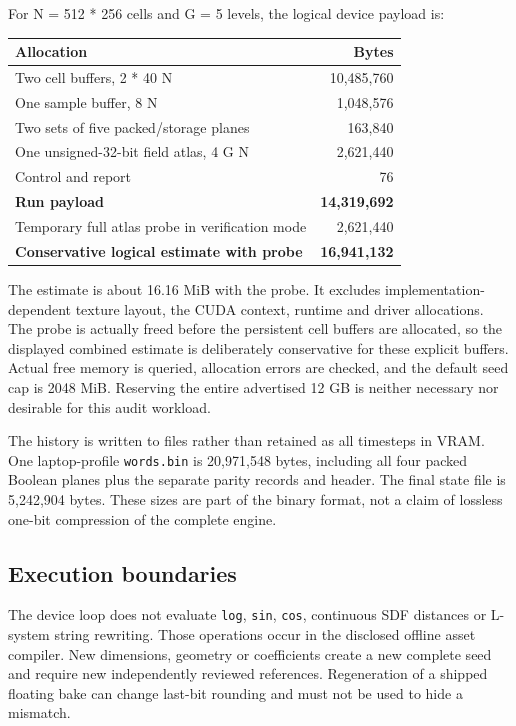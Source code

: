 \documentclass[11pt,a4paper]{article}
\begin{document}
For N = 512 * 256 cells and G = 5 levels, the logical device payload is:

\begin{longtable}[]{@{}lr@{}}
\toprule\noalign{}
Allocation & Bytes \\
\midrule\noalign{}
\endhead
\bottomrule\noalign{}
\endlastfoot
Two cell buffers, 2 * 40 N & 10,485,760 \\
One sample buffer, 8 N & 1,048,576 \\
Two sets of five packed/storage planes & 163,840 \\
One unsigned-32-bit field atlas, 4 G N & 2,621,440 \\
Control and report & 76 \\
\textbf{Run payload} & \textbf{14,319,692} \\
Temporary full atlas probe in verification mode & 2,621,440 \\
\textbf{Conservative logical estimate with probe} & \textbf{16,941,132} \\
\end{longtable}

The estimate is about 16.16 MiB with the probe. It excludes implementation-dependent texture layout, the CUDA context, runtime and driver allocations. The probe is actually freed before the persistent cell buffers are allocated, so the displayed combined estimate is deliberately conservative for these explicit buffers. Actual free memory is queried, allocation errors are checked, and the default seed cap is 2048 MiB. Reserving the entire advertised 12 GB is neither necessary nor desirable for this audit workload.

The history is written to files rather than retained as all timesteps in VRAM. One laptop-profile \texttt{words.bin} is 20,971,548 bytes, including all four packed Boolean planes plus the separate parity records and header. The final state file is 5,242,904 bytes. These sizes are part of the binary format, not a claim of lossless one-bit compression of the complete engine.

\subsection{Execution boundaries}\label{execution-boundaries}

The device loop does not evaluate \texttt{log}, \texttt{sin}, \texttt{cos}, continuous SDF distances or L-system string rewriting. Those operations occur in the disclosed offline asset compiler. New dimensions, geometry or coefficients create a new complete seed and require new independently reviewed references. Regeneration of a shipped floating bake can change last-bit rounding and must not be used to hide a mismatch.
\end{document}
